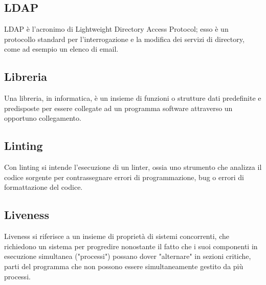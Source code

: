 
\subsection*{LDAP}
LDAP è l'acronimo di Lightweight Directory Access Protocol; esso è un protocollo standard per l'interrogazione e la modifica dei servizi di directory, come ad esempio un elenco di email.

\subsection*{Libreria}
Una libreria, in informatica, è un insieme di funzioni o strutture dati predefinite e predisposte per essere collegate ad un programma software attraverso un opportuno collegamento.

\subsection*{Linting}
Con linting si intende l'esecuzione di un linter, ossia uno strumento che analizza il codice sorgente per contrassegnare errori di programmazione, bug o errori di formattazione del codice.

\subsection*{Liveness}
Liveness si riferisce a un insieme di proprietà di sistemi concorrenti, che richiedono un sistema per progredire nonostante il fatto che i suoi componenti in esecuzione simultanea ("processi") possano dover "alternare" in sezioni critiche, parti del programma che non possono essere simultaneamente gestito da più processi.

